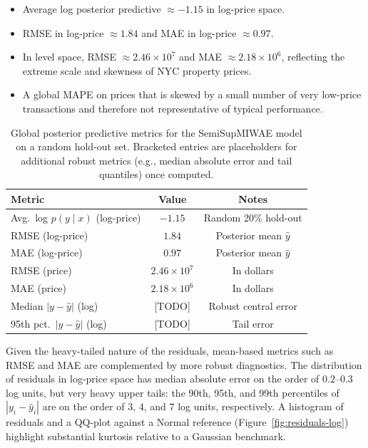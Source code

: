 \documentclass[11pt]{article}
\begin{document}
\begin{itemize}[noitemsep]
    \item Average log posterior predictive $\approx -1.15$ in log-price space.
    \item RMSE in log-price $\approx 1.84$ and MAE in log-price $\approx 0.97$.
    \item In level space, RMSE $\approx 2.46\times 10^7$ and MAE $\approx 2.18\times 10^6$, reflecting the extreme scale and skewness of NYC property prices.
    \item A global MAPE on prices that is skewed by a small number of very low-price transactions and therefore not representative of typical performance.
\end{itemize}

\begin{table}[t]
    \centering
    \begin{tabular}{lcc}
        \toprule
        Metric & Value & Notes \\
        \midrule
        Avg.\ log $p(y \mid x)$ (log-price) & $-1.15$ & Random 20\% hold-out \\
        RMSE (log-price) & $1.84$ & Posterior mean $\hat{y}$ \\
        MAE (log-price) & $0.97$ & Posterior mean $\hat{y}$ \\
        RMSE (price) & $2.46 \times 10^7$ & In dollars \\
        MAE (price) & $2.18 \times 10^6$ & In dollars \\
        Median $|y - \hat{y}|$ (log) & [TODO] & Robust central error \\
        95th pct.\ $|y - \hat{y}|$ (log) & [TODO] & Tail error \\
        \bottomrule
    \end{tabular}
    \caption{Global posterior predictive metrics for the SemiSupMIWAE model on a random hold-out set. Bracketed entries are placeholders for additional robust metrics (e.g., median absolute error and tail quantiles) once computed.}
    \label{tab:global-metrics}
\end{table}

Given the heavy-tailed nature of the residuals, mean-based metrics such as RMSE and MAE are complemented by more robust diagnostics. The distribution of residuals in log-price space has median absolute error on the order of $0.2$--$0.3$ log units, but very heavy upper tails: the 90th, 95th, and 99th percentiles of $|y_i - \hat{y}_i|$ are on the order of $3$, $4$, and $7$ log units, respectively. A histogram of residuals and a QQ-plot against a Normal reference (Figure~\ref{fig:residuals-log}) highlight substantial kurtosis relative to a Gaussian benchmark.
\end{document}
